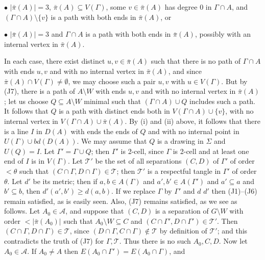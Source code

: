\hspace*{12pt}$\bullet$ $|\bar{\pi}(A)| = 3$, $\bar{\pi}(A) \subseteq V(\Gamma)$, some $v \in \bar{\pi}(A)$ has degree 0 in $\Gamma \cap A$, and $(\Gamma \cap A) \setminus \{v\}$ is a path with both ends in $\bar{\pi}(A)$, or

\hspace*{12pt}$\bullet$ $|\bar{\pi}(A)| = 3$ and $\Gamma \cap A$ is a path with both ends in $\bar{\pi}(A)$, possibly with an internal vertex in $\bar{\pi}(A)$.

In each case, there exist distinct $u, v \in \bar{\pi}(A)$ such that there is no path of $\Gamma \cap A$ with ends $u, v$ and with no internal vertex in $\bar{\pi}(A)$, and since $\bar{\pi}(A) \cap V(\Gamma) \ne \emptyset$, we may choose such a pair $u, v$ with $u \in V(\Gamma)$. But by (J7), there is a path of $A \setminus W$ with ends $u, v$ and with no internal vertex in $\bar{\pi}(A)$; let us choose $Q \subseteq A \setminus W$ minimal such that $(\Gamma \cap A) \cup Q$ includes such a path. It follows that $Q$ is a path with distinct ends both in $V(\Gamma \cap A) \cup \{v\}$, with no internal vertex in $V(\Gamma \cap A) \cup \bar{\pi}(A)$. By (i) and (ii) above, it follows that there is a line $I$ in $D(A)$ with ends the ends of $Q$ and with no internal point in $U(\Gamma) \cup bd(D(A))$. We may assume that $Q$ is a drawing in $\Sigma$ and $U(Q) = I$. Let $\Gamma' = \Gamma \cup Q$; then $\Gamma'$ is 2-cell, since $\Gamma$ is 2-cell and at least one end of $I$ is in $V(\Gamma)$. Let $\mathcal{T}'$ be the set of all separations $(C, D)$ of $\Gamma'$ of order $< \theta$ such that $(C \cap \Gamma, D \cap \Gamma) \in \mathcal{T}$; then $\mathcal{T}'$ is a respectful tangle in $\Gamma'$ of order $\theta$. Let $d'$ be its metric; then if $a, b \in A(\Gamma)$ and $a', b' \in A(\Gamma')$ and $a' \subseteq a$ and $b' \subseteq b$, then $d'(a', b') \ge d(a, b)$. If we replace $\Gamma$ by $\Gamma'$ and $d$  $d'$ then (J1)--(J6) remain satisfied, as is easily seen. Also, (J7) remains satisfied, as we see as follows. Let $A_0 \in \mathcal{A}$, and suppose that $(C, D)$ is a separation of $G \setminus W$ with order $< |\bar{\pi}(A_0)|$ such that $A_0 \setminus W \subseteq C$ and $(C \cap \Gamma', D \cap \Gamma') \in \mathcal{T}'$. Then $(C \cap \Gamma, D \cap \Gamma) \in \mathcal{T}$, since $(D \cap \Gamma, C \cap \Gamma) \notin \mathcal{T}$ by definition of $\mathcal{T}'$; and this contradicts the truth of (J7) for $\Gamma, \mathcal{T}$. Thus there is no such $A_0, C, D$. Now let $A_0 \in \mathcal{A}$. If $A_0 \ne A$ then $E(A_0 \cap \Gamma') = E(A_0 \cap \Gamma)$, and
